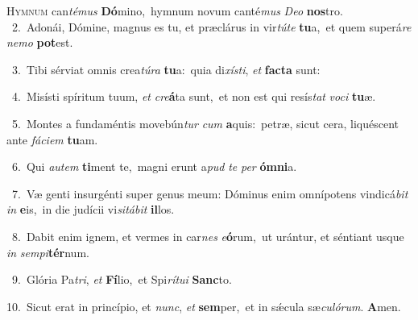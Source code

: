 \lettrine{\initial\textcolor{\initialcolor}{H}}{ymnum} can\-\textit{té}\-\textit{mus} \textbf{Dó}\-mino,~\star hymnum novum canté\textit{mus} \textit{De}\-\textit{o} \textbf{nos}\-tro.\\
{\numbfont\textcolor{\numbcolor}{~2.}}~Adonái, Dómine, magnus es tu, et præclárus in vir\-\textit{tú}\-\textit{te} \textbf{tu}\-a,~\star et quem superá\textit{re} \textit{ne}\-\textit{mo} \textbf{pot}\-est.\par
{\numbfont\textcolor{\numbcolor}{~3.}}~Tibi sérviat omnis crea\-\textit{tú}\-\textit{ra} \textbf{tu}\-a:~\star quia di\-\textit{xís}\-\textit{ti}, \textit{et} \textbf{fac}\-\textbf{ta} sunt:\par
{\numbfont\textcolor{\numbcolor}{~4.}}~Misísti spíritum tuum, \textit{et} \textit{cre}\-\textbf{á}ta sunt,~\star et non est qui resís\textit{tat} \textit{vo}\-\textit{ci} \textbf{tu}\-æ.\par
{\numbfont\textcolor{\numbcolor}{~5.}}~Montes a fundaméntis movebún\textit{tur} \textit{cum} \textbf{a}\-quis:~\star petræ, sicut cera, liquéscent ante \textit{fá}\-\textit{ci}\textit{em} \textbf{tu}\-am.\par
{\numbfont\textcolor{\numbcolor}{~6.}}~Qui \textit{au}\-\textit{tem} \textbf{ti}\-ment te,~\star magni erunt a\textit{pud} \textit{te} \textit{per} \textbf{óm}\-\textbf{ni}a.\par
{\numbfont\textcolor{\numbcolor}{~7.}}~Væ genti insurgénti super genus meum: Dóminus enim omnípotens vindicá\textit{bit} \textit{in} \textbf{e}\-is,~\star in die judícii vi\-\textit{si}\-\textit{tá}\textit{bit} \textbf{il}\-los.\par
{\numbfont\textcolor{\numbcolor}{~8.}}~Dabit enim ignem, et vermes in car\textit{nes} \textit{e}\-\textbf{ó}rum,~\star ut urántur, et séntiant usque \textit{in} \textit{sem}\-\textit{pi}\textbf{tér}num.\par
{\numbfont\textcolor{\numbcolor}{~9.}}~Glória Pa\-\textit{tri}\-, \textit{et} \textbf{Fí}\-lio,~\star et Spi\-\textit{rí}\-\textit{tu}\textit{i} \textbf{Sanc}\-to.\par
{\numbfont\textcolor{\numbcolor}{10.}}~Sicut erat in princípio, et \textit{nunc}\-, \textit{et} \textbf{sem}\-per,~\star et in sǽcula sæ\-\textit{cu}\-\textit{ló}\textit{rum}. \textbf{A}\-men.\par
